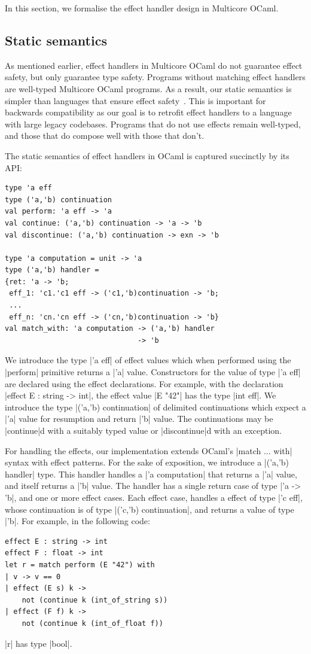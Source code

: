 \documentclass[sigplan,10pt,review,anonymous]{acmart}\settopmatter{printfolios=true,printccs=false,printacmref=false}
\begin{document}
In this section, we formalise the effect handler design in Multicore OCaml.

\subsection{Static semantics}

As mentioned earlier, effect handlers in Multicore OCaml do not guarantee
effect safety, but only guarantee type safety. Programs without matching effect
handlers are well-typed Multicore OCaml programs. As a result, our static
semantics is simpler than languages that ensure effect
safety~\cite{Links,Koka,Effekt,Frank,HeliumBiernacki}. This is important for
backwards compatibility as our goal is to retrofit effect handlers to a
language with large legacy codebases. Programs that do not use effects remain
well-typed, and those that do compose well with those that don't.

The static semantics of effect handlers in OCaml is captured succinctly by its
API:
\begin{lstlisting}
type 'a eff
type ('a,'b) continuation
val perform: 'a eff -> 'a
val continue: ('a,'b) continuation -> 'a -> 'b
val discontinue: ('a,'b) continuation -> exn -> 'b

type 'a computation = unit -> 'a
type ('a,'b) handler =
{ret: 'a -> 'b;
 eff_1: 'c1.'c1 eff -> ('c1,'b)continuation -> 'b;
 ...
 eff_n: 'cn.'cn eff -> ('cn,'b)continuation -> 'b}
val match_with: 'a computation -> ('a,'b) handler
                               -> 'b
\end{lstlisting}

We introduce the type |'a eff| of effect values which when performed using the
|perform| primitive returns a |'a| value. Constructors for the value of type
|'a eff| are declared using the effect declarations. For example, with the
declaration |effect E : string -> int|, the effect value |E "42"| has the type
|int eff|. We introduce the type |('a,'b) continuation| of delimited
continuations which expect a |'a| value for resumption and return |'b| value.
The continuations may be |continue|d with a suitably typed value or
|discontinue|d with an exception.

For handling the effects, our implementation extends OCaml's |match ... with|
syntax with effect patterns. For the sake of exposition, we introduce a
|('a,'b) handler| type. This handler handles a |'a computation| that returns a
|'a| value, and itself returns a |'b| value. The handler has a single return
case of type |'a -> 'b|, and one or more effect cases. Each effect case,
handles a effect of type |'c eff|, whose continuation is of type
|('c,'b) continuation|, and returns a value of type |'b|. For example, in the
following code:
\begin{lstlisting}
effect E : string -> int
effect F : float -> int
let r = match perform (E "42") with
| v -> v == 0
| effect (E s) k ->
    not (continue k (int_of_string s))
| effect (F f) k ->
    not (continue k (int_of_float f))
\end{lstlisting}
\noindent |r| has type |bool|.
\end{document}
